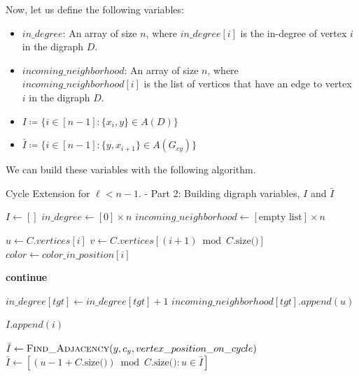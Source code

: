 Now, let us define the following variables:

\begin{itemize}
    \item $in\_degree$: An array of size $n$, where $in\_degree[i]$ is the in-degree of vertex $i$ in the digraph $D$.
    \item $incoming\_neighborhood$: An array of size $n$, where $incoming\_neighborhood[i]$ is the list of vertices that have an edge to vertex $i$ in the digraph $D$.
    \item $I \coloneqq \{i \in [n - 1]: \{x_i, y\} \in A(D)\}$
    \item $\bar{I} \coloneqq \{i \in [n - 1]: \{y, x_{i+1}\} \in A(G_{cy})\}$
\end{itemize}

We can build these variables with the following algorithm.

\begin{algorithm}[H]
    \caption{Cycle Extension for \( \ell < n - 1 \). - Part 2: Building digraph variables, $I$ and $\bar{I}$}
    \begin{algorithmic}[1]
            \State $I \gets []$
            \State $in\_degree \gets [0] \times n$
            \State $incoming\_neighborhood \gets [\text{empty list}] \times n$
            
                \State $u \gets C.vertices[i]$
                \State $v \gets C.vertices[(i + 1) \bmod C.\text{size()}]$
                \State $color \gets color\_in\_position[i]$

                        \State \textbf{continue}
                    \EndIf
                    
                    \State $in\_degree[tgt] \gets in\_degree[tgt] + 1$
                    \State $incoming\_neighborhood[tgt].append(u)$
                    
                        \State $I.append(i)$
                    \EndIf
                \EndFor
            \EndFor
            
            \State $\bar{I} \gets \Call{Find\_Adjacency}{y, c_y, vertex\_position\_on\_cycle}$
            \State $\bar{I} \gets [(u - 1 + C.\text{size()}) \bmod C.\text{size()} : u \in \bar{I}]$

        \EndFunction
    \end{algorithmic}
\end{algorithm}

